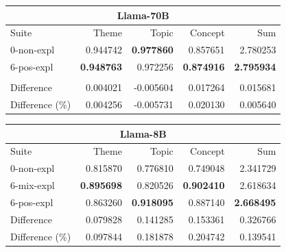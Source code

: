 \begin{table}
    \centering
    \tiny

    \begin{tabular}{lrrrr}
    \toprule
    \multicolumn{5}{c}{\textbf{Llama-70B}} \\
    \midrule
    Suite & Theme & Topic & Concept & Sum \\
    \midrule
    0-non-expl & 0.944742 & \bfseries 0.977860 & 0.857651 & 2.780253 \\
    6-pos-expl & \bfseries 0.948763 & 0.972256 & \bfseries 0.874916 & \bfseries 2.795934 \\
    & & & & \\
    \midrule
    Difference & 0.004021 & -0.005604 & 0.017264 & 0.015681 \\
    Difference (\%) & 0.004256 & -0.005731 & 0.020130 & 0.005640 \\
    \bottomrule
    \end{tabular}
    \quad
    \begin{tabular}{lrrrr}
    \toprule
    \multicolumn{5}{c}{\textbf{Llama-8B}} \\
    \midrule
    Suite & Theme & Topic & Concept & Sum \\
    \midrule
    0-non-expl & 0.815870 & 0.776810 & 0.749048 & 2.341729 \\
    6-mix-expl & \bfseries 0.895698 & 0.820526 & \bfseries 0.902410 & 2.618634 \\
    6-pos-expl & 0.863260 & \bfseries 0.918095 & 0.887140 & \bfseries 2.668495 \\
    \midrule
    Difference & 0.079828 & 0.141285 & 0.153361 & 0.326766 \\
    Difference (\%) & 0.097844 & 0.181878 & 0.204742 & 0.139541 \\
    \bottomrule
    \end{tabular}

    \quad
    

\end{table}
